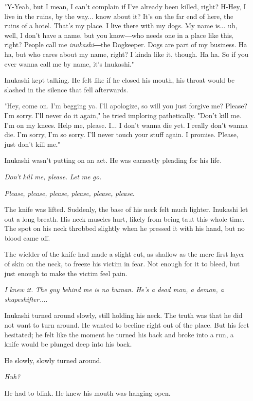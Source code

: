 "Y-Yeah, but I mean, I can't complain if I've already been killed,
right? H-Hey, I live in the ruins, by the way... know about it? It's on
the far end of here, the ruins of a hotel. That's my place. I live there
with my dogs. My name is... uh, well, I don't have a name, but you
know―who needs one in a place like this, right? People call me
\emph{inukashi}―the Dogkeeper. Dogs are part of my business. Ha ha, but who
cares about my name, right? I kinda like it, though. Ha ha. So if you
ever wanna call me by name, it's Inukashi."

Inukashi kept talking. He felt like if he closed his mouth, his throat
would be slashed in the silence that fell afterwards.

"Hey, come on. I'm begging ya. I'll apologize, so will you just forgive
me? Please? I'm sorry. I'll never do it again," he tried imploring
pathetically. "Don't kill me. I'm on my knees. Help me, please. I... I
don't wanna die yet. I really don't wanna die. I'm sorry, I'm so sorry.
I'll never touch your stuff again. I promise. Please, just don't kill
me."

Inukashi wasn't putting on an act. He was earnestly pleading for his
life.

\emph{Don't kill me, please. Let me go.}

\emph{Please, please, please, please, please, please.}

The knife was lifted. Suddenly, the base of his neck felt much lighter.
Inukashi let out a long breath. His neck muscles hurt, likely from being
taut this whole time. The spot on his neck throbbed slightly when he
pressed it with his hand, but no blood came off.

The wielder of the knife had made a slight cut, as shallow as the mere
first layer of skin on the neck, to freeze his victim in fear. Not
enough for it to bleed, but just enough to make the victim feel pain.

\emph{I knew it. The guy behind me is no human. He's a dead man, a demon, a
shapeshifter....}

Inukashi turned around slowly, still holding his neck. The truth was
that he did not want to turn around. He wanted to beeline right out of
the place. But his feet hesitated; he felt like the moment he turned his
back and broke into a run, a knife would be plunged deep into his back.

He slowly, slowly turned around.

\emph{Huh?}

He had to blink. He knew his mouth was hanging open.

